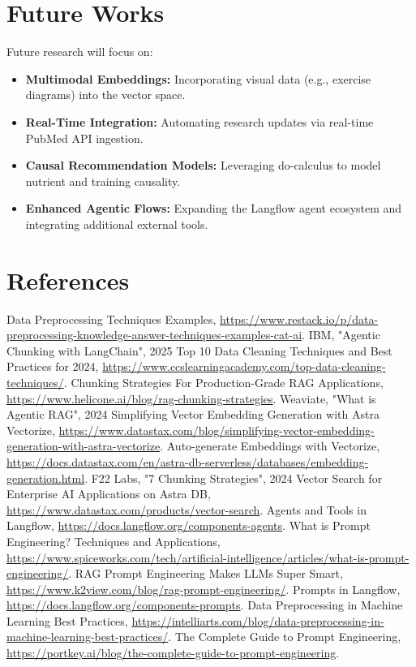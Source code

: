 \documentclass[conference]{IEEEtran}
\begin{document}
\section{Future Works}
Future research will focus on:
\begin{itemize}
    \item \textbf{Multimodal Embeddings:} Incorporating visual data (e.g., exercise diagrams) into the vector space.
    \item \textbf{Real-Time Integration:} Automating research updates via real-time PubMed API ingestion.
    \item \textbf{Causal Recommendation Models:} Leveraging do-calculus to model nutrient and training causality.
    \item \textbf{Enhanced Agentic Flows:} Expanding the Langflow agent ecosystem and integrating additional external tools.
\end{itemize}

\section*{References}
\begin{thebibliography}{00}
 Data Preprocessing Techniques Examples, \url{https://www.restack.io/p/data-preprocessing-knowledge-answer-techniques-examples-cat-ai}.
 IBM, "Agentic Chunking with LangChain", 2025
 Top 10 Data Cleaning Techniques and Best Practices for 2024, \url{https://www.ccslearningacademy.com/top-data-cleaning-techniques/}.
 Chunking Strategies For Production-Grade RAG Applications, \url{https://www.helicone.ai/blog/rag-chunking-strategies}.
 Weaviate, "What is Agentic RAG", 2024
 Simplifying Vector Embedding Generation with Astra Vectorize, \url{https://www.datastax.com/blog/simplifying-vector-embedding-generation-with-astra-vectorize}.
 Auto-generate Embeddings with Vectorize, \url{https://docs.datastax.com/en/astra-db-serverless/databases/embedding-generation.html}.
 F22 Labs, "7 Chunking Strategies", 2024
 Vector Search for Enterprise AI Applications on Astra DB, \url{https://www.datastax.com/products/vector-search}.
 Agents and Tools in Langflow, \url{https://docs.langflow.org/components-agents}.
 What is Prompt Engineering? Techniques and Applications, \url{https://www.spiceworks.com/tech/artificial-intelligence/articles/what-is-prompt-engineering/}.
 RAG Prompt Engineering Makes LLMs Super Smart, \url{https://www.k2view.com/blog/rag-prompt-engineering/}.
 Prompts in Langflow, \url{https://docs.langflow.org/components-prompts}.
 Data Preprocessing in Machine Learning Best Practices, \url{https://intelliarts.com/blog/data-preprocessing-in-machine-learning-best-practices/}.
 The Complete Guide to Prompt Engineering, \url{https://portkey.ai/blog/the-complete-guide-to-prompt-engineering}.
\end{thebibliography}
\end{document}
